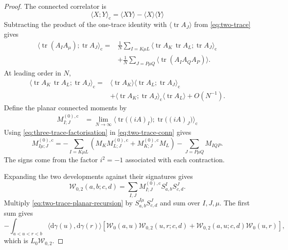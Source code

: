 \documentclass[11pt,a4paper]{article}
\DeclareMathOperator{\tr}{tr}
\newcommand{\cW}{\mathcal{W}}
\newcommand{\dd}{\mathrm{d}}
\begin{document}
\begin{proof}
The connected correlator is
\begin{equation}
\langle X;Y\rangle_{\mathrm c}
=
\langle XY\rangle-\langle X\rangle\langle Y\rangle
\end{equation}
Subtracting the product of the one-trace identity with $\langle\tr A_J\rangle$ from \eqref{eq:two-trace} gives
\begin{equation}\label{eq:two-trace-conn}
\begin{aligned}
\bigl\langle\tr(A_I A_\mu);\tr A_J\bigr\rangle_{\mathrm c} =& \frac{1}{N}\sum_{I=K\mu L} \bigl\langle\tr A_K\,\tr A_L;\tr A_J\bigr\rangle_{\mathrm c}
\\ &+ \frac{1}{N}\sum_{J=P\mu Q} \bigl\langle\tr(A_I A_Q A_P)\bigr\rangle.
\end{aligned}
\end{equation}
At leading order in $N$,
\begin{equation}\label{eq:three-trace-factorisation}
\begin{aligned}
\bigl\langle\tr A_K\,\tr A_L;\tr A_J\bigr\rangle_{\mathrm c}
=& \langle\tr A_K\rangle \bigl\langle\tr A_L;\tr A_J\bigr\rangle_{\mathrm c}
\\ &+ \bigl\langle\tr A_K;\tr A_J\bigr\rangle_{\mathrm c} \langle\tr A_L\rangle +O(N^{-1}).
\end{aligned}
\end{equation}
Define the planar connected moments by
\begin{equation}\label{eq:planar-connected-moments}
\begin{aligned}
M^{(0),\mathrm c}_{I;J}
&=
\lim_{N\to\infty}
\bigl\langle
\tr\bigl((iA)_I\bigr);
\tr\bigl((iA)_J\bigr)
\bigr\rangle_{\mathrm c}
\end{aligned}
\end{equation}
Using \eqref{eq:three-trace-factorisation} in \eqref{eq:two-trace-conn} gives
\begin{equation}\label{eq:two-trace-planar-recursion}
M^{(0),\mathrm c}_{I\mu;J} = -\sum_{I=K\mu L} \left( M_K M^{(0),\mathrm c}_{L;J} + M^{(0),\mathrm c}_{K;J}M_L \right) -\sum_{J=P\mu Q}M_{IQP}.
\end{equation}
The signs come from the factor $i^2=-1$ associated with each
contraction.

Expanding the two developments against their signatures gives
\begin{equation}\label{eq:W02-signature-expansion}
\cW_{0,2}(a,b;c,d) = \sum_{I,J} M^{(0),\mathrm c}_{I;J} S^I_{a,b}S^J_{c,d}.
\end{equation}
Multiply \eqref{eq:two-trace-planar-recursion} by $S^{I\mu}_{a,b}S^J_{c,d}$ and sum over $I,J,\mu$. The first sum gives
\begin{equation}
-\int_{a<u<r<b} \bigl\langle\dd\gamma(u),\dd\gamma(r)\bigr\rangle \left[ \cW_0(a,u)\cW_{0,2}(u,r;c,d) + \cW_{0,2}(a,u;c,d)\cW_0(u,r) \right],
\end{equation}
which is $L_0\cW_{0,2}$.


\end{proof}
\end{document}

